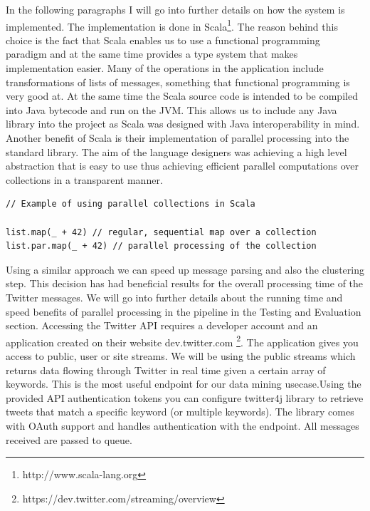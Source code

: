 In the following paragraphs I will go into further details on how the system is implemented.
\newline
The implementation is done in Scala\footnote{http://www.scala-lang.org}. The reason behind this choice is the fact that Scala enables us to use a functional programming paradigm and at the same time provides a type system that makes implementation easier. Many of the operations in the application include transformations of lists of messages, something that functional programming is very good at. At the same time the Scala source code is intended to be compiled into Java bytecode and run on the JVM. This allows us to include any Java library into the project as Scala was designed with Java interoperability in mind.
\newline
Another benefit of Scala is their implementation of parallel processing into the standard library. The aim of the language designers was achieving a high level abstraction that is easy to use thus achieving efficient parallel computations over collections in a transparent manner.
\begin{lstlisting}[caption=Example of parallel collection usage in Scala, label=scala_parallel_collections]
// Example of using parallel collections in Scala

list.map(_ + 42) // regular, sequential map over a collection
list.par.map(_ + 42) // parallel processing of the collection
\end{lstlisting}
Using a similar approach we can speed up message parsing and also the clustering step. This decision has had beneficial results for the overall processing time of the Twitter messages. We will go into further details about the running time and speed benefits of parallel processing in the pipeline in the Testing and Evaluation section.
\newline
\newline
Accessing the Twitter API requires a developer account and an application created on their website dev.twitter.com \footnote{https://dev.twitter.com/streaming/overview}. The application gives you access to public, user or site streams. We will be using the public streams which returns data flowing through Twitter in real time given a certain array of keywords. This is the most useful endpoint for our data mining usecase.Using the provided API authentication tokens you can configure twitter4j library to retrieve tweets that match a specific keyword (or multiple keywords). The library comes with OAuth support and handles authentication with the endpoint. All messages received are passed to queue.
